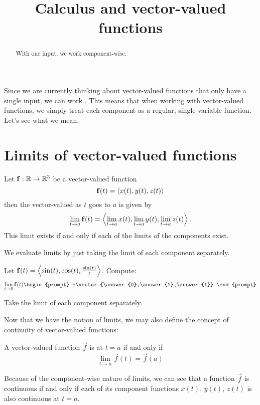 \documentclass{ximera}
\title[Dig-In:]{Calculus and vector-valued functions}
\begin{document}
\begin{abstract}
  With one input, we work component-wise.
\end{abstract}
\maketitle


Since we are currently thinking about vector-valued functions that
only have a single input, we can work . This
means that when working with vector-valued functions, we simply treat
each component as a regular, single variable function. Let's see what
we mean.

\section{Limits of vector-valued functions}

\begin{definition}
  Let $\mathbf{f}:\mathbb R \to \mathbb R^3$ be a vector-valued function
  \[
  \mathbf{f}(t) = \left\langle x(t),y(t),z(t)\right\rangle
  \]
  then the vector-valued  as $t$ goes to $a$ is given by 
  \[
  \lim_{t \to a} \mathbf{f}(t) = \left\langle \lim_{t \to a}x(t),\lim_{t \to a}y(t),\lim_{t \to a}z(t)\right\rangle.
  \]
  This limit exists if and only if each of the limits of the
  components exist.
\end{definition}

We evaluate limits by just taking the limit of each component
separately.

\begin{question}
  Let $\mathbf{f}(t) = \left\langle \sin(t),\cos(t),\frac{\sin(t)}{t}\right\rangle$.
  Compute:
  \[
  \lim_{t \to 0} \vec{f}(t)
  \begin{prompt}
    =\vector{\answer{0},\answer{1},\answer{1}}
  \end{prompt}
  \]
  \begin{hint}
    Take the limit of each component separately.
  \end{hint}
\end{question}

Now that we have the notion of limits, we may also define the concept
of continuity of vector-valued functions:

\begin{definition}
  A vector-valued function $\vec{f}$ is  at $t= a$ if
  and only if
  \[
  \lim_{t \to a} \vec{f}(t)  = \vec{f}(a)
  \]
\end{definition}
Because of the component-wise nature of limits, we can see that a
function $\vec{f}$ is continuous if and only if each of its component
functions $x(t)$, $y(t)$, $z(t)$ is also continuous at $t=a$.
\end{document}
